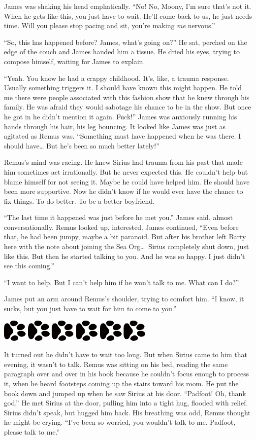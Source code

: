 \documentclass[12pt,twoside,openright]{memoir}
\newcommand{\dogPrintRule}{	
	\begin{center}
		\hspace{.5em}
		\includegraphics[angle=60]{dogprint.pdf}
		\hspace{.5em}
		\includegraphics[angle=120]{dogprint.pdf}
		\hspace{.5em}
		\includegraphics[angle=60]{dogprint.pdf}
		\hspace{.5em}
		\includegraphics[angle=120]{dogprint.pdf}
		\hspace{.5em}
		\includegraphics[angle=60]{dogprint.pdf}
		\hspace{.5em}
		\includegraphics[angle=120]{dogprint.pdf}
		\hspace{.5em}
	\end{center}
}
\begin{document}
James was shaking his head emphatically. ``No! No, Moony, I'm sure that's not it. When he gets like this, you just have to wait. He'll come back to us, he just needs time. Will you please stop pacing and sit, you're making
\textit{me} nervous.''

``So, this has happened before? James, what's going on?'' He sat, perched on the edge of the couch and James handed him a tissue. He dried his eyes, trying to compose himself, waiting for James to explain.

``Yeah. You know he had a crappy childhood. It's, like, a trauma response. Usually something triggers it. I should have known this might happen. He told me there were people associated with this fashion show that he knew through his family. He was afraid they would sabotage his chance to be in the show. But once he got in he didn't mention it again. Fuck!'' James was anxiously running his hands through his hair, his leg bouncing. It looked like James was just as agitated as Remus was. ``Something must have happened when he was there. I should have… But he's been so much better lately!''

Remus's mind was racing. He knew Sirius had trauma from his past that made him sometimes act irrationally. But he never expected this. He couldn't help but blame himself for not seeing it. Maybe he could have helped him. He should have been more supportive. Now he didn't know if he would ever have the chance to fix things. To do better. To be a better boyfriend.

``The last time it happened was just before he met you.'' James said, almost conversationally. Remus looked up, interested. James continued, ``Even before that, he had been jumpy, maybe a bit paranoid. But after his brother left Barty here with the note about joining the Sea Org\ldots\ Sirius completely shut down, just like this. But then he started talking to you. And he was so happy. I just didn't see this coming.'' 

``I want to help. But I can't help him if he won't talk to me. What can I do?'' 

James put an arm around Remus's shoulder, trying to comfort him. ``I know, it sucks, but you just have to wait for him to come to you.''

\dogPrintRule

It turned out he didn't have to wait too long. But when Sirius came to him that evening, it wasn't to talk. Remus was sitting on his bed, reading the same paragraph over and over in his book because he couldn't focus enough to process it, when he heard footsteps coming up the stairs toward his room. He put the book down and jumped up when he saw Sirius at his door. ``Padfoot! Oh, thank god.'' He met Sirius at the door, pulling him into a tight hug, flooded with relief. Sirius didn't speak, but hugged him back. His breathing was odd, Remus thought he might be crying. ``I've been so worried, you wouldn't talk to me. Padfoot, please talk to me.''
\end{document}
